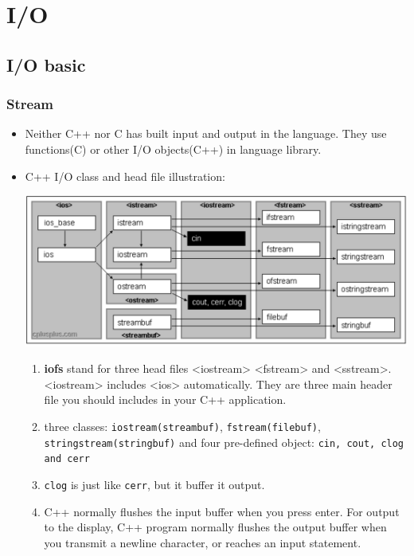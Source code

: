\documentclass[a4paper,11pt,twoside]{book}
\begin{document}
\chapter{I/O}

\section{I/O basic}

\subsection{Stream}

\begin{itemize}
	\item Neither C++ nor C has built input and output in the language. They use functions(C) or other I/O objects(C++) in language library.
	
	\item C++ I/O class and head file illustration: 
	\begin{center}
			\includegraphics[scale=0.5]{pics/io.png}
	\end{center}

	\begin{enumerate}
		
		\item \textbf{iofs} stand for three head files <iostream> <fstream> and <sstream>. <iostream> includes <ios> automatically. They are three main header file you should includes in your C++ application.
		
		\item three classes: \texttt{iostream(streambuf)}, \texttt{fstream(filebuf)}, \texttt{stringstream(stringbuf)} and four pre-defined object: \texttt{cin, cout, clog and cerr} 
		
		\item \texttt{clog} is just like \texttt{cerr}, but it buffer it output.
		
		\item C++ normally flushes the input buffer when you press enter. For output to the display, C++ program normally flushes the output buffer when you transmit a newline character, or reaches an input statement.
		

\end{enumerate}
\end{itemize}
\end{document}
